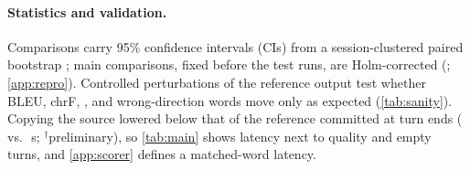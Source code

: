\paragraph{Statistics and validation.}
Comparisons carry 95\% confidence intervals (CIs) from a session-clustered paired bootstrap \citep{koehn2004statistical}; main comparisons, fixed before the test runs, are Holm-corrected (\citealp{holm1979simple}; \cref{app:repro}). Controlled perturbations of the reference output test whether BLEU, chrF, \laal, \eo and wrong-direction words move only as expected (\cref{tab:sanity}). Copying the source lowered \deen \laal below that of the reference committed at turn ends ( vs.\ \,s; $^\dagger$preliminary), so \cref{tab:main} shows latency next to quality and empty turns, and \cref{app:scorer} defines a matched-word latency.
